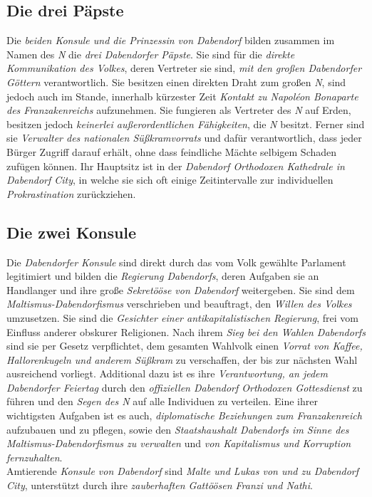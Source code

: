 \subsection{{Die drei Päpste}}
Die \textit{beiden Konsule und die Prinzessin von Dabendorf} bilden zusammen im Namen des \textit{N} die \textit{drei Dabendorfer Päpste}. Sie sind für die \textit{direkte Kommunikation des Volkes}, deren Vertreter sie sind, \textit{mit den großen Dabendorfer Göttern} verantwortlich. Sie besitzen einen direkten Draht zum großen \textit{N}, sind jedoch auch im Stande, innerhalb kürzester Zeit \textit{Kontakt zu Napoléon Bonaparte des Franzakenreichs} aufzunehmen. Sie fungieren als Vertreter des \textit{N} auf Erden, besitzen jedoch \textit{keinerlei außerordentlichen Fähigkeiten}, die \textit{N} besitzt. Ferner sind sie \textit{Verwalter des nationalen Süßkramvorrats} und dafür verantwortlich, dass jeder Bürger Zugriff darauf erhält, ohne dass feindliche Mächte selbigem Schaden zufügen können. Ihr Hauptsitz ist in der \textit{Dabendorf Orthodoxen Kathedrale in Dabendorf City}, in welche sie sich oft einige Zeitintervalle zur individuellen \textit{Prokrastination} zurückziehen.

\subsection{{Die zwei Konsule}}
Die \textit{Dabendorfer Konsule} sind direkt durch das vom Volk gewählte Parlament legitimiert und bilden die \textit{Regierung Dabendorfs}, deren Aufgaben sie an Handlanger und ihre große \textit{Sekretööse von Dabendorf} weitergeben. Sie sind dem \textit{Maltismus-Dabendorfismus} verschrieben und beauftragt, den \textit{Willen des Volkes} umzusetzen. Sie sind die \textit{Gesichter einer antikapitalistischen Regierung}, frei vom Einfluss anderer obskurer Religionen. Nach ihrem \textit{Sieg bei den Wahlen Dabendorfs} sind sie per Gesetz verpflichtet, dem gesamten Wahlvolk einen \textit{Vorrat von Kaffee, Hallorenkugeln und anderem Süßkram} zu verschaffen, der bis zur nächsten Wahl ausreichend vorliegt. Additional dazu ist es ihre \textit{Verantwortung, an jedem Dabendorfer Feiertag} durch den \textit{offiziellen Dabendorf Orthodoxen Gottesdienst} zu führen und den \textit{Segen des N} auf alle Individuen zu verteilen. Eine ihrer wichtigsten Aufgaben ist es auch, \textit{diplomatische Beziehungen zum Franzakenreich} aufzubauen und zu pflegen, sowie den \textit{Staatshaushalt Dabendorfs im Sinne des Maltismus-Dabendorfismus zu verwalten} und \textit{von Kapitalismus und Korruption fernzuhalten}.\\
Amtierende \textit{Konsule von Dabendorf} sind \textit{Malte und Lukas von und zu Dabendorf City}, unterstützt durch ihre \textit{zauberhaften Gattöösen Franzi und Nathi}.

